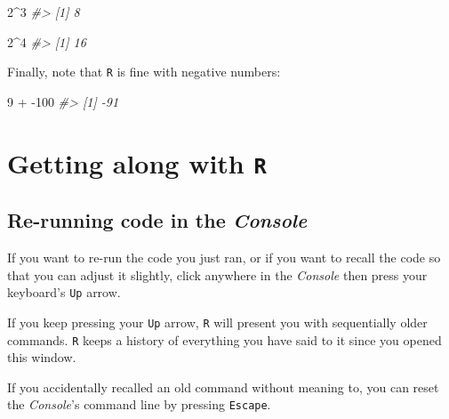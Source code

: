 \documentclass[
]{book}
\newenvironment{Shaded}{\begin{snugshade}}{\end{snugshade}}
\newcommand{\CommentTok}[1]{\textcolor[rgb]{0.56,0.35,0.01}{\textit{#1}}}
\newcommand{\DecValTok}[1]{\textcolor[rgb]{0.00,0.00,0.81}{#1}}
\newcommand{\SpecialCharTok}[1]{\textcolor[rgb]{0.00,0.00,0.00}{#1}}
\begin{document}
\begin{Shaded}
\begin{Highlighting}[]
\DecValTok{2}\SpecialCharTok{\^{}}\DecValTok{3}
\CommentTok{\#\textgreater{} [1] 8}
\end{Highlighting}
\end{Shaded}

\begin{Shaded}
\begin{Highlighting}[]
\DecValTok{2}\SpecialCharTok{\^{}}\DecValTok{4}
\CommentTok{\#\textgreater{} [1] 16}
\end{Highlighting}
\end{Shaded}

Finally, note that \texttt{R} is fine with negative numbers:

\begin{Shaded}
\begin{Highlighting}[]
\DecValTok{9} \SpecialCharTok{+} \SpecialCharTok{{-}}\DecValTok{100}
\CommentTok{\#\textgreater{} [1] {-}91}
\end{Highlighting}
\end{Shaded}

\hypertarget{getting-along-with-r}{%
\section*{\texorpdfstring{Getting along with \texttt{R}}{Getting along with R}}\label{getting-along-with-r}}

\hypertarget{re-running-code-in-the-console}{%
\subsection*{\texorpdfstring{Re-running code in the \emph{Console}}{Re-running code in the Console}}\label{re-running-code-in-the-console}}

If you want to re-run the code you just ran, or if you want to recall the code so that you can adjust it slightly, click anywhere in the \emph{Console} then press your keyboard's \texttt{Up} arrow.

If you keep pressing your \texttt{Up} arrow, \texttt{R} will present you with sequentially older commands. \texttt{R} keeps a history of everything you have said to it since you opened this window.

If you accidentally recalled an old command without meaning to, you can reset the \emph{Console}'s command line by pressing \texttt{Escape}.
\end{document}

